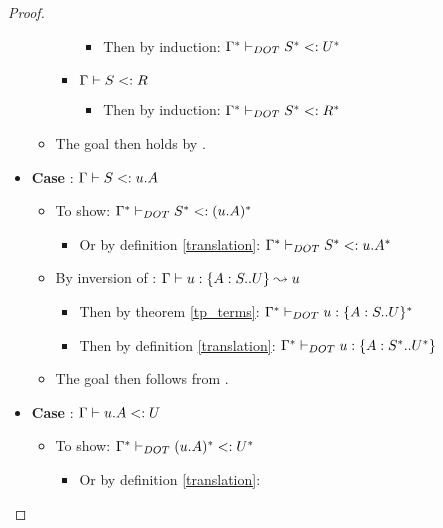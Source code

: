 \begin{proof}
\begin{itemize}
\begin{itemize}
\begin{itemize}
\begin{itemize}
                    \item Then by induction:
                        $\Gamma^{*} \vdash_{DOT} S^{*} <: U^{*}$
                \end{itemize}
                \item $\Gamma \vdash S <: R$
                \begin{itemize}
                    \item Then by induction:
                        $\Gamma^{*} \vdash_{DOT} S^{*} <: R^{*}$
                \end{itemize}
            \end{itemize}
            \item The goal then holds by .
        \end{itemize}
        \item \textbf{Case} : $\Gamma \vdash S <: u.A$
        \begin{itemize}
            \item To show: $\Gamma^{*} \vdash_{DOT} S^{*} <: (u.A)^{*}$
            \begin{itemize}
                \item Or by definition \ref{translation}:
                    $\Gamma^{*} \vdash_{DOT} S^{*} <: u.A^{*}$
            \end{itemize}
            \item By inversion of :
                $\Gamma \vdash u: \{A : S .. U\} \leadsto u$
            \begin{itemize}
                \item Then by theorem \ref{tp_terms}:
                    $\Gamma^{*} \vdash_{DOT} u: \{A : S .. U\}^{*}$
                \item Then by definition \ref{translation}:
                    $\Gamma^{*} \vdash_{DOT} u: \{A : S^{*} .. U^{*}\}$
            \end{itemize}
            \item The goal then follows from .
        \end{itemize}
        \item \textbf{Case} : $\Gamma \vdash u.A <: U$
        \begin{itemize}
            \item To show: $\Gamma^{*} \vdash_{DOT} (u.A)^{*} <: U^{*}$
            \begin{itemize}
                \item Or by definition \ref{translation}:

\end{itemize}
\end{itemize}
\end{itemize}
\end{proof}
